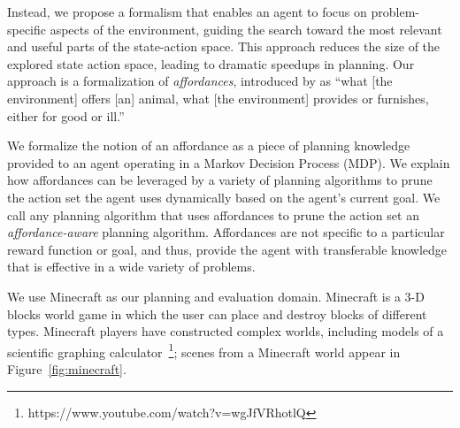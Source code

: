 \documentclass[]{article}
\begin{document}
Instead, we propose a formalism that enables an agent to focus on
problem-specific aspects of the environment, guiding the search toward
the most relevant and useful parts of the state-action space.  This
approach reduces the size of the explored state action space, leading
to dramatic speedups in planning.  Our approach is a formalization of
{\em affordances}, introduced by \citet{gibson77} as ``what [the
  environment] offers [an] animal, what [the environment] provides or
furnishes, either for good or ill.''
      
      We formalize the notion of an affordance as a piece of planning
      knowledge provided to an agent operating in a Markov Decision
      Process (MDP). We explain how affordances can be leveraged by a
      variety of planning algorithms to prune the action set the agent
      uses dynamically based on the agent's current goal.  We call any
      planning algorithm that uses affordances to prune the action set
      an {\it affordance-aware} planning algorithm.  Affordances are
      not specific to a particular reward function or goal, and thus,
      provide the agent with transferable knowledge that is effective
      in a wide variety of problems.




We use Minecraft as our planning and evaluation domain. Minecraft is a
3-D blocks world game in which the user can place and destroy blocks
of different types.  Minecraft players have constructed complex
worlds, including models of a scientific graphing
calculator~\footnote{https://www.youtube.com/watch?v=wgJfVRhotlQ};
scenes from a Minecraft world appear in Figure~\ref{fig:minecraft}.  
\end{document}
